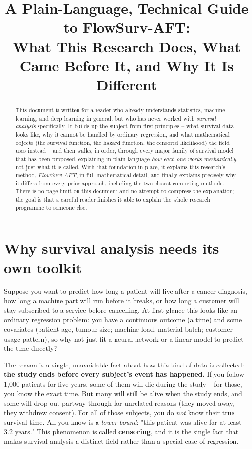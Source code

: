 \documentclass[11pt]{article}
\title{A Plain-Language, Technical Guide to FlowSurv-AFT:\\
What This Research Does, What Came Before It, and Why It Is Different}
\author{}
\date{}
\begin{document}
\maketitle

\begin{abstract}
\noindent
This document is written for a reader who already understands statistics,
machine learning, and deep learning in general, but who has never worked
with \emph{survival analysis} specifically. It builds up the subject from
first principles -- what survival data looks like, why it cannot be
handled by ordinary regression, and what mathematical objects (the
survival function, the hazard function, the censored likelihood) the
field uses instead -- and then walks, in order, through every major family
of survival model that has been proposed, explaining in plain language
\emph{how each one works mechanically}, not just what it is called. With
that foundation in place, it explains this research's method,
\emph{FlowSurv-AFT}, in full mathematical detail, and finally explains
precisely why it differs from every prior approach, including the two
closest competing methods. There is no page limit on this document and no
attempt to compress the explanation; the goal is that a careful reader
finishes it able to explain the whole research programme to someone else.
\end{abstract}

\tableofcontents

\newpage

\section{Why survival analysis needs its own toolkit}
\label{sec:why}

Suppose you want to predict how long a patient will live after a cancer
diagnosis, how long a machine part will run before it breaks, or how long
a customer will stay subscribed to a service before cancelling. At first
glance this looks like an ordinary regression problem: you have a
continuous outcome (a time) and some covariates (patient age, tumour
size; machine load, material batch; customer usage pattern), so why not
just fit a neural network or a linear model to predict the time directly?

The reason is a single, unavoidable fact about how this kind of data is
collected: \textbf{the study ends before every subject's event has
happened.} If you follow 1{,}000 patients for five years, some of them
will die during the study -- for those, you know the exact time. But many
will still be alive when the study ends, and some will drop out partway
through for unrelated reasons (they moved away, they withdrew consent).
For all of those subjects, you do \emph{not} know their true survival
time. All you know is a \emph{lower bound}: "this patient was alive for
at least 3.2 years." This phenomenon is called \textbf{censoring}, and it
is the single fact that makes survival analysis a distinct field rather
than a special case of regression.
\end{document}
